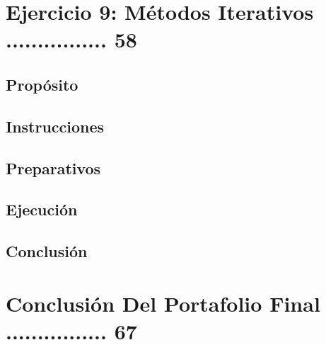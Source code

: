 \documentclass{article}
\begin{document}
\section{Ejercicio 9: Métodos Iterativos ................ 58 }
\subsection{Propósito}
\subsection{Instrucciones}
\subsection{Preparativos}
\subsection{Ejecución}
\subsection{Conclusión}

\section{Conclusión Del Portafolio Final ................ 67}
\end{document}
